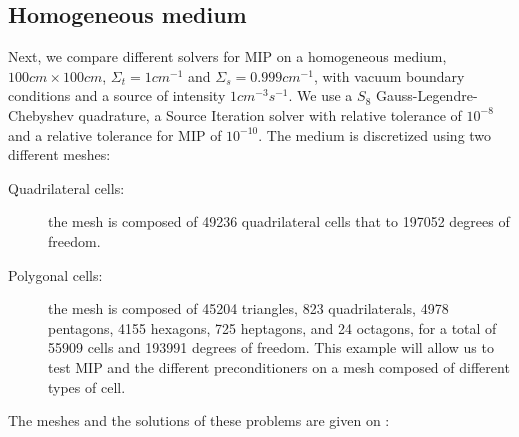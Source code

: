 \subsection{Homogeneous medium}
Next, we compare different solvers for MIP on a homogeneous medium, $100cm
\times 100cm$, $\Sigma_t = 1cm^{-1}$ and $\Sigma_s = 0.999cm^{-1}$, with
vacuum boundary conditions and a source of intensity $1cm^{-3}s^{-1}$. We
use a $S_8$ Gauss-Legendre-Chebyshev quadrature, a Source Iteration solver
with relative tolerance of $10^{-8}$ and a relative tolerance for MIP of
$10^{-10}$. The medium is discretized using two different meshes:
\begin{description}
  \item[Quadrilateral cells:] the mesh is composed of 49236 quadrilateral
    cells that to 197052 degrees of freedom.
  \item[Polygonal cells:] the mesh is composed of 45204 triangles, 823
    quadrilaterals, 4978 pentagons, 4155 hexagons, 725 heptagons, and 24
    octagons, for a total of 55909 cells and 193991 degrees of freedom. This
    example will allow us to test MIP and the different preconditioners on a
    mesh composed of different types of cell.
\end{description}
The meshes and the solutions of these problems are given on
:
